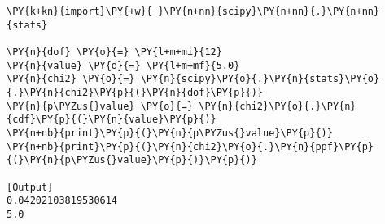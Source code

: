\begin{Verbatim}[label=\makebox{\href{https://github.com/unipi-physics-labs/lab1-notes/tree/main/snippy/scipy.stats.chi2.py}{https://github.com/.../scipy.stats.chi2.py}},commandchars=\\\{\}]
\PY{k+kn}{import}\PY{+w}{ }\PY{n+nn}{scipy}\PY{n+nn}{.}\PY{n+nn}{stats}

\PY{n}{dof} \PY{o}{=} \PY{l+m+mi}{12}
\PY{n}{value} \PY{o}{=} \PY{l+m+mf}{5.0}
\PY{n}{chi2} \PY{o}{=} \PY{n}{scipy}\PY{o}{.}\PY{n}{stats}\PY{o}{.}\PY{n}{chi2}\PY{p}{(}\PY{n}{dof}\PY{p}{)}
\PY{n}{p\PYZus{}value} \PY{o}{=} \PY{n}{chi2}\PY{o}{.}\PY{n}{cdf}\PY{p}{(}\PY{n}{value}\PY{p}{)}
\PY{n+nb}{print}\PY{p}{(}\PY{n}{p\PYZus{}value}\PY{p}{)}
\PY{n+nb}{print}\PY{p}{(}\PY{n}{chi2}\PY{o}{.}\PY{n}{ppf}\PY{p}{(}\PY{n}{p\PYZus{}value}\PY{p}{)}\PY{p}{)}

[Output]
0.04202103819530614
5.0
\end{Verbatim}
